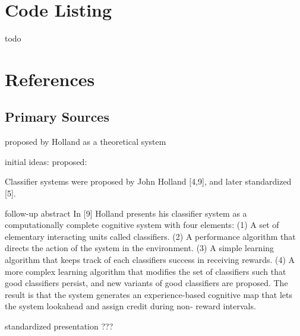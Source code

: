 \documentclass[a4paper, 11pt]{article}
\begin{document}
\section{Code Listing}
\label{sec:code}
todo


\section{References}
\label{sec:references}

% 
% 
\subsection{Primary Sources}

proposed by Holland as a theoretical system

initial ideas:
proposed: \cite{Holland1976}


Classifier systems were proposed by John Holland [4,9], and later standardized [5]. 

follow-up abstract \cite{Holland1977}
In [9] Holland presents his classifier system as a computationally complete cognitive system with four elements: (1) A set of elementary interacting units called classifiers. (2) A performance algorithm that directs the action of the system in the environment. (3) A simple learning algorithm that keeps track of each classifiers success in receiving rewards. (4) A more complex learning algorithm that modifies the set of classifiers such that good classifiers persist, and new variants of good classifiers are proposed. The result is that the system generates an experience-based cognitive map that lets the system lookahead and assign credit during non-
reward intervals.

standardized presentation \cite{Holland1980}
???
\end{document}
